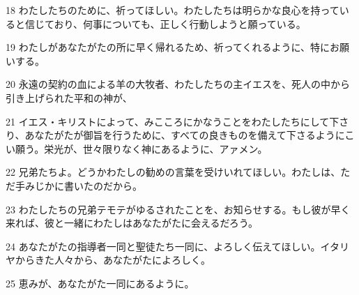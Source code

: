 \par 18 わたしたちのために、祈ってほしい。わたしたちは明らかな良心を持っていると信じており、何事についても、正しく行動しようと願っている。
\par 19 わたしがあなたがたの所に早く帰れるため、祈ってくれるように、特にお願いする。
\par 20 永遠の契約の血による羊の大牧者、わたしたちの主イエスを、死人の中から引き上げられた平和の神が、
\par 21 イエス・キリストによって、みこころにかなうことをわたしたちにして下さり、あなたがたが御旨を行うために、すべての良きものを備えて下さるようにこい願う。栄光が、世々限りなく神にあるように、アァメン。
\par 22 兄弟たちよ。どうかわたしの勧めの言葉を受けいれてほしい。わたしは、ただ手みじかに書いたのだから。
\par 23 わたしたちの兄弟テモテがゆるされたことを、お知らせする。もし彼が早く来れば、彼と一緒にわたしはあなたがたに会えるだろう。
\par 24 あなたがたの指導者一同と聖徒たち一同に、よろしく伝えてほしい。イタリヤからきた人々から、あなたがたによろしく。
\par 25 恵みが、あなたがた一同にあるように。



